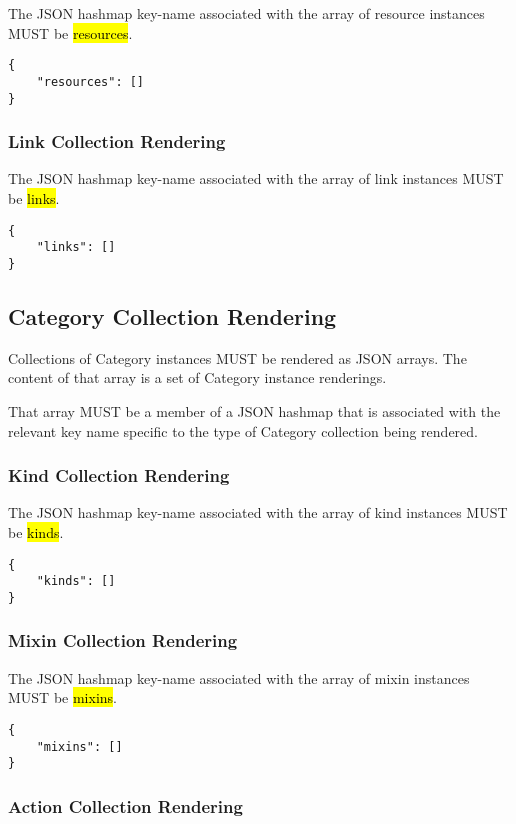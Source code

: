 \documentclass[10pt,a4paper]{article}
\begin{document}
The JSON hashmap key-name associated with the array of resource instances MUST be \hl{resources}.

\begin{lstlisting}
{
    "resources": []
}

\end{lstlisting}

\subsubsection{Link Collection Rendering}

The JSON hashmap key-name associated with the array of link instances MUST be \hl{links}.

\begin{lstlisting}
{
    "links": []
}
\end{lstlisting}

\subsection{Category Collection Rendering}
Collections of Category instances MUST be rendered as JSON arrays. The content of that array is a set of Category instance renderings.

That array MUST be a member of a JSON hashmap that is associated with the relevant key name specific to the type of Category collection being rendered.


\subsubsection{Kind Collection Rendering}

The JSON hashmap key-name associated with the array of kind instances MUST be \hl{kinds}.

\begin{lstlisting}
{
    "kinds": []
}
\end{lstlisting}

\subsubsection{Mixin Collection Rendering}

The JSON hashmap key-name associated with the array of mixin instances MUST be \hl{mixins}.

\begin{lstlisting}
{
    "mixins": []
}
\end{lstlisting}

\subsubsection{Action Collection Rendering}
\end{document}
